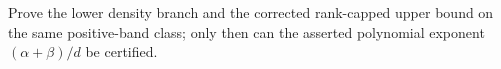 Prove the lower density branch and the corrected rank-capped upper bound on the same positive-band class; only then can the asserted polynomial exponent \((\alpha+\beta)/d\) be certified.